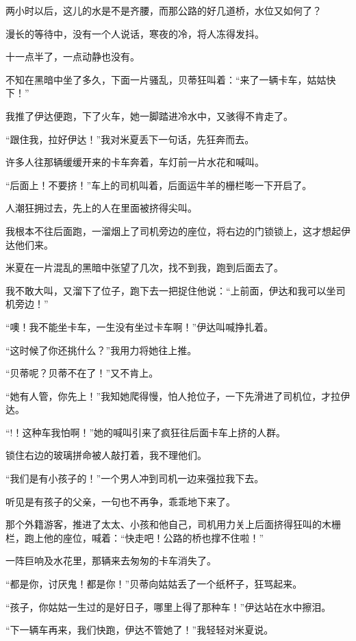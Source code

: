\par 两小时以后，这儿的水是不是齐腰，而那公路的好几道桥，水位又如何了？
\par 漫长的等待中，没有一个人说话，寒夜的冷，将人冻得发抖。
\par 十一点半了，一点动静也没有。
\par 不知在黑暗中坐了多久，下面一片骚乱，贝蒂狂叫着：“来了一辆卡车，姑姑快下！”
\par 我推了伊达便跑，下了火车，她一脚踏进冷水中，又骇得不肯走了。
\par “跟住我，拉好伊达！”我对米夏丢下一句话，先狂奔而去。
\par 许多人往那辆缓缓开来的卡车奔着，车灯前一片水花和喊叫。
\par “后面上！不要挤！”车上的司机叫着，后面运牛羊的栅栏嘭一下开启了。
\par 人潮狂拥过去，先上的人在里面被挤得尖叫。
\par 我根本不往后面跑，一溜烟上了司机旁边的座位，将右边的门锁锁上，这才想起伊达他们来。
\par 米夏在一片混乱的黑暗中张望了几次，找不到我，跑到后面去了。
\par 我不敢大叫，又溜下了位子，跑下去一把捉住他说：“上前面，伊达和我可以坐司机旁边！”
\par “噢！我不能坐卡车，一生没有坐过卡车啊！”伊达叫喊挣扎着。
\par “这时候了你还挑什么？”我用力将她往上推。
\par “贝蒂呢？贝蒂不在了！”又不肯上。
\par “她有人管，你先上！”我知她爬得慢，怕人抢位子，一下先滑进了司机位，才拉伊达。
\par “!！这种车我怕啊！”她的喊叫引来了疯狂往后面卡车上挤的人群。
\par 锁住右边的玻璃拼命被人敲打着，我不理他们。
\par “我们是有小孩子的！”一个男人冲到司机一边来强拉我下去。
\par 听见是有孩子的父亲，一句也不再争，乖乖地下来了。
\par 那个外籍游客，推进了太太、小孩和他自己，司机用力关上后面挤得狂叫的木栅栏，跑上他的座位，喊着：“快走吧！公路的桥也撑不住啦！”
\par 一阵巨响及水花里，那辆来去匆匆的卡车消失了。
\par “都是你，讨厌鬼！都是你！”贝蒂向姑姑丢了一个纸杯子，狂骂起来。
\par “孩子，你姑姑一生过的是好日子，哪里上得了那种车！”伊达站在水中擦泪。
\par “下一辆车再来，我们快跑，伊达不管她了！”我轻轻对米夏说。

